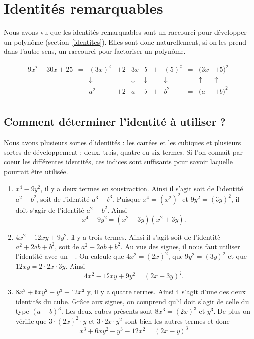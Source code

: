 \section{Identités remarquables}

Nous avons vu que les identités remarquables sont un raccourci pour développer un polynôme (section~\ref{identites}). Elles sont donc naturellement, si on les prend dans l'autre sens, un raccourci pour factoriser un polynôme.

\begin{exemple}
$$
\begin{array}{rcccccccccc}
9x^2 + 30 x + 25 & = & (3x)^2 & +2 &3x& 5 &+ & (5)^2 & = & (3x &+ 5)^2    \\
& &\downarrow & &\downarrow & \downarrow & & \downarrow& &\uparrow & \uparrow \\
& & a^2 & +2 & a & b &+ & b^2 & = & (a & +b)^2   \\
\end{array}
$$
\end{exemple}

\subsection{Comment déterminer l'identité à utiliser ?}

Nous avons plusieurs sortes d'identités : les carrées et les cubiques et plusieurs sortes de développement : deux, trois, quatre ou six termes. Si l'on conna\^it par coeur les différentes identités, ces indices sont suffisants pour savoir laquelle pourrait être utilisée.

\begin{exemple}
\begin{enumerate}
\item $x^4 - 9y^2$, il y a deux termes en soustraction. Ainsi il s'agit soit de l'identité $a^2-b^2$, soit de l'identité $a^3 - b^3$. Puisque $x^4 = (x^2)^2$ et $9y^2 = (3y)^2$, il doit s'agir de l'identité $a^2 - b^2$. Ainsi
$$
x^4 - 9y^2 = (x^2-3y)(x^2+ 3y).
$$
\item $4x^2 - 12xy + 9y^2$, il y a trois termes. Ainsi il s'agit soit de l'identité $a^2 + 2ab + b^2$, soit de $a^2 - 2ab + b^2$. Au vue des signes, il nous faut utiliser l'identité avec un $-$. On calcule que $4x^2 = (2x)^2$, que $9y^2 = (3y)^2$ et que $12xy = 2 \cdot 2x \cdot 3y$. Ainsi
$$
4x^2 - 12xy + 9y^2 = (2x-3y)^2.
$$
\item $8x^3 + 6xy^2 - y^3 - 12x^2$ y, il y a quatre termes. Ainsi il s'agit d'une des deux identités du cube. Grâce aux signes, on comprend qu'il doit s'agir de celle du type $(a-b)^3$. Les deux cubes présents sont $8x^3 = (2x)^3$ et $y^3$. De plus on vérifie que $3\cdot (2x)^2 \cdot y$ et $3 \cdot 2x \cdot y^2$ sont bien les autres termes et donc
$$
x^3 + 6xy^2 - y^3 - 12x^2 = (2x-y)^3
$$
\end{enumerate}
\end{exemple}

